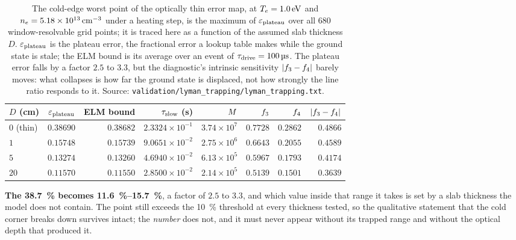 \begin{table}[tbp]
  \centering
  \caption[Lyman trapping at the cold-edge worst point]{The cold-edge worst
  point of the optically thin error map, at $T_e = \SI{1.0}{\electronvolt}$ and
  $n_e = 5.18\times10^{13}\,\si{\per\cubic\centi\metre}$ under a heating step,
  is the maximum of $\varepsilon_{\mathrm{plateau}}$ over all $680$ window-resolvable grid points; it
  is traced here as a function of the assumed slab thickness $D$. $\varepsilon_{\mathrm{plateau}}$ is the plateau
  error, the fractional error a lookup table makes while the ground state is
  stale; the ELM bound is its average over an event of
  $\tau_{\mathrm{drive}} = \SI{100}{\micro\second}$. The plateau error falls by a factor
  $2.5$ to $3.3$, but the diagnostic's intrinsic sensitivity
  $|f_{3}-f_{4}|$ barely moves: what collapses is how far the ground
  state is displaced, not how strongly the line ratio responds to it. Source:
  \texttt{validation/lyman\_trapping/lyman\_trapping.txt}.}
  \label{tab:trapping_worstpoint}
  \small
  \begin{tabular}{lrrrrrrr}
    \toprule
    $D$ (cm) & $\varepsilon_{\mathrm{plateau}}$ & ELM bound & $\tau_{\mathrm{slow}}$ (s) & $M$ &
    $f_{3}$ & $f_{4}$ & $|f_{3}-f_{4}|$ \\
    \midrule
    $0$ (thin) & $0.38690$ & $0.38682$ & $2.3324\times10^{-1}$ & $3.74\times10^{7}$ & $0.7728$ & $0.2862$ & $0.4866$ \\
    $1$        & $0.15748$ & $0.15739$ & $9.0651\times10^{-2}$ & $2.75\times10^{6}$ & $0.6643$ & $0.2055$ & $0.4589$ \\
    $5$        & $0.13274$ & $0.13260$ & $4.6940\times10^{-2}$ & $6.13\times10^{5}$ & $0.5967$ & $0.1793$ & $0.4174$ \\
    $20$       & $0.11570$ & $0.11550$ & $2.8500\times10^{-2}$ & $2.14\times10^{5}$ & $0.5139$ & $0.1501$ & $0.3639$ \\
    \bottomrule
  \end{tabular}
\end{table}

\textbf{The \SI{38.7}{\percent} becomes \SIrange{11.6}{15.7}{\percent}}, a
factor of $2.5$ to $3.3$, and which value inside that range it takes is set
by a slab thickness the model does not contain. The point still exceeds the
\SI{10}{\percent} threshold at every thickness tested, so the qualitative
statement that the cold corner breaks down survives intact; the \emph{number}
does not, and it must never appear without its trapped range and without the
optical depth that produced it.

